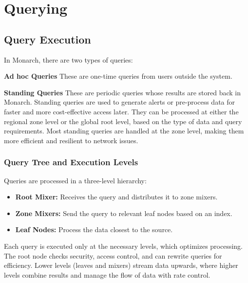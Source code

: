 


\section{Querying}

\subsection{Query Execution}

In Monarch, there are two types of queries:

\textbf{Ad hoc Queries}
These are one-time queries from users outside the system.

\textbf{Standing Queries}
These are periodic queries whose results are stored back in Monarch. Standing queries are used to generate alerts or pre-process data for faster and more cost-effective access later. They can be processed at either the regional zone level or the global root level, based on the type of data and query requirements. Most standing queries are handled at the zone level, making them more efficient and resilient to network issues.

\subsubsection{Query Tree and Execution Levels}
Queries are processed in a three-level hierarchy:
\begin{itemize}
    \item \textbf{Root Mixer:} Receives the query and distributes it to zone mixers.
    \item \textbf{Zone Mixers:} Send the query to relevant leaf nodes based on an index.
    \item \textbf{Leaf Nodes:} Process the data closest to the source.
\end{itemize}
Each query is executed only at the necessary levels, which optimizes processing. The root node checks security, access control, and can rewrite queries for efficiency. Lower levels (leaves and mixers) stream data upwards, where higher levels combine results and manage the flow of data with rate control.

